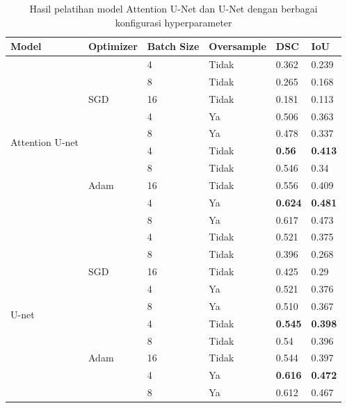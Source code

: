 \begin{table}[H]
	\caption{Hasil pelatihan model Attention U-Net dan U-Net dengan berbagai konfigurasi hyperparameter}
	\label{tab:training-results}
	\begin{tabular}{llllll}
		\hline
		Model                             & Optimizer             & Batch Size & Oversample & DSC            & IoU            \\ \hline
		\multirow{10}{*}{Attention U-net} & \multirow{5}{*}{SGD}  & 4          & Tidak      & 0.362          & 0.239          \\
		&                       & 8          & Tidak      & 0.265          & 0.168          \\
		&                       & 16         & Tidak      & 0.181          & 0.113          \\ \cline{3-6} 
		&                       & 4          & Ya         & 0.506          & 0.363          \\
		&                       & 8          & Ya         & 0.478          & 0.337          \\ \cline{2-6} 
		& \multirow{5}{*}{Adam} & 4          & Tidak      & \textbf{0.56}  & \textbf{0.413} \\
		&                       & 8          & Tidak      & 0.546          & 0.34           \\
		&                       & 16         & Tidak      & 0.556          & 0.409          \\ \cline{3-6} 
		&                       & 4          & Ya         & \textbf{0.624} & \textbf{0.481} \\
		&                       & 8          & Ya         & 0.617          & 0.473          \\ \hline
		\multirow{10}{*}{U-net}           & \multirow{5}{*}{SGD}  & 4          & Tidak      & 0.521          & 0.375          \\
		&                       & 8          & Tidak      & 0.396          & 0.268          \\
		&                       & 16         & Tidak      & 0.425          & 0.29           \\ \cline{3-6} 
		&                       & 4          & Ya         & 0.521          & 0.376          \\
		&                       & 8          & Ya         & 0.510          & 0.367          \\ \cline{2-6} 
		& \multirow{5}{*}{Adam} & 4          & Tidak      & \textbf{0.545} & \textbf{0.398} \\
		&                       & 8          & Tidak      & 0.54           & 0.396          \\
		&                       & 16         & Tidak      & 0.544          & 0.397          \\ \cline{3-6} 
		&                       & 4          & Ya         & \textbf{0.616} & \textbf{0.472} \\
		&                       & 8          & Ya         & 0.612          & 0.467          \\ \hline
	\end{tabular}
\end{table}

